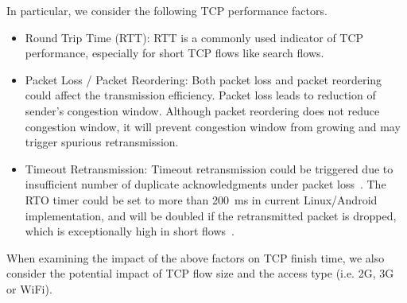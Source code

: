 In particular, we consider the following TCP performance factors. 

\begin{itemize}
	\item {Round Trip Time (RTT): } RTT is a commonly used indicator of TCP performance, especially for short TCP flows like search flows.
	

	\item {Packet Loss / Packet Reordering: } Both packet loss and packet reordering could affect the transmission efficiency. Packet loss leads to reduction of sender's congestion window. Although packet reordering does not reduce congestion window, it will prevent congestion window from growing and may trigger spurious retransmission. \\
	
	\item {Timeout Retransmission: } Timeout retransmission could be triggered due to insufficient number of duplicate acknowledgments under packet loss~\cite{rfc6675}. The RTO timer could be set to more than 200~ms in current Linux/Android implementation, and will be doubled if the retransmitted packet is dropped, which is exceptionally high in short flows~\cite{flach2013reducing}.\\
	
\end{itemize}

When examining the impact of the above factors on TCP finish time, we also consider the potential impact of TCP flow size and the access type (i.e. 2G, 3G or WiFi). 


